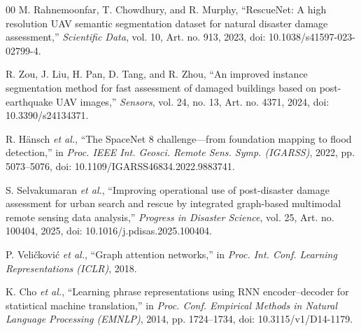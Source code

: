 \documentclass[conference]{IEEEtran}
\begin{document}
\balance
\begin{thebibliography}{00}
M. Rahnemoonfar, T. Chowdhury, and R. Murphy, ``RescueNet: A high resolution UAV semantic segmentation dataset for natural disaster damage assessment,'' \emph{Scientific Data}, vol. 10, Art. no. 913, 2023, doi: 10.1038/s41597-023-02799-4.

R. Zou, J. Liu, H. Pan, D. Tang, and R. Zhou, ``An improved instance segmentation method for fast assessment of damaged buildings based on post-earthquake UAV images,'' \emph{Sensors}, vol. 24, no. 13, Art. no. 4371, 2024, doi: 10.3390/s24134371.

R. H\"ansch \emph{et al.}, ``The SpaceNet 8 challenge---from foundation mapping to flood detection,'' in \emph{Proc. IEEE Int. Geosci. Remote Sens. Symp. (IGARSS)}, 2022, pp. 5073--5076, doi: 10.1109/IGARSS46834.2022.9883741.

S. Selvakumaran \emph{et al.}, ``Improving operational use of post-disaster damage assessment for urban search and rescue by integrated graph-based multimodal remote sensing data analysis,'' \emph{Progress in Disaster Science}, vol. 25, Art. no. 100404, 2025, doi: 10.1016/j.pdisas.2025.100404.

P. Veli\v{c}kovi\'c \emph{et al.}, ``Graph attention networks,'' in \emph{Proc. Int. Conf. Learning Representations (ICLR)}, 2018.

K. Cho \emph{et al.}, ``Learning phrase representations using RNN encoder--decoder for statistical machine translation,'' in \emph{Proc. Conf. Empirical Methods in Natural Language Processing (EMNLP)}, 2014, pp. 1724--1734, doi: 10.3115/v1/D14-1179.

\end{thebibliography}
\end{document}
